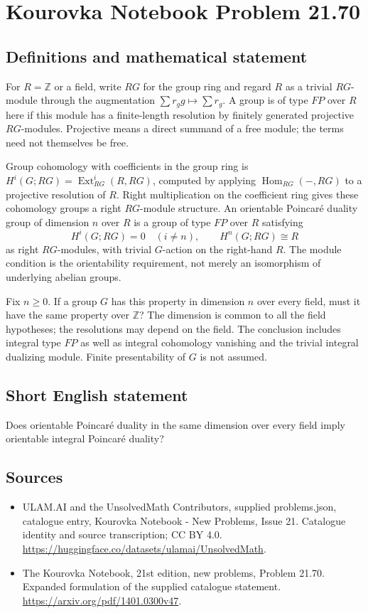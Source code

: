 \documentclass[11pt,a4paper]{article}
\begin{document}
\section*{Kourovka Notebook Problem 21.70}\label{statement}

\subsection{Definitions and mathematical statement}
For $R=\mathbb Z$ or a field, write $RG$ for the group ring and regard
$R$ as a trivial $RG$-module through the augmentation
$\sum r_g g\mapsto\sum r_g$. A group is of type $FP$ over $R$ here
if this module has a finite-length resolution by finitely generated
projective $RG$-modules. Projective means a direct summand of a free
module; the terms need not themselves be free.

Group cohomology with coefficients in the group ring is
$H^i(G;RG)=\operatorname{Ext}_{RG}^i(R,RG)$, computed by applying
$\operatorname{Hom}_{RG}(-,RG)$ to a projective resolution of $R$.
Right multiplication on the coefficient ring gives these cohomology
groups a right $RG$-module structure.
An orientable Poincar\'e duality group of dimension $n$ over $R$ is a
group of type $FP$ over $R$ satisfying
\[
 H^i(G;RG)=0\quad(i\ne n),\qquad H^n(G;RG)\cong R
\]
as right $RG$-modules, with trivial $G$-action on the right-hand $R$.
The module condition is the orientability requirement, not merely an
isomorphism of underlying abelian groups.

Fix $n\ge0$. If a group $G$ has this property in dimension $n$ over
every field, must it have the same property over $\mathbb Z$?
The dimension is common to all the field hypotheses; the resolutions
may depend on the field. The conclusion includes integral type $FP$
as well as integral cohomology vanishing and the trivial integral
dualizing module. Finite presentability of $G$ is not assumed.
\subsection{Short English statement}
Does orientable Poincaré duality in the same dimension over every field imply orientable integral Poincaré duality?
\subsection{Sources}
\begin{itemize}
\item[S1] ULAM.AI and the UnsolvedMath Contributors, supplied problems.json, catalogue entry, Kourovka Notebook - New Problems, Issue 21. Catalogue identity and source transcription; CC BY 4.0.
\url{https://huggingface.co/datasets/ulamai/UnsolvedMath}.
\item[S2] The Kourovka Notebook, 21st edition, new problems, Problem 21.70. Expanded formulation of the supplied catalogue statement.
\url{https://arxiv.org/pdf/1401.0300v47}.
\end{itemize}
\end{document}
